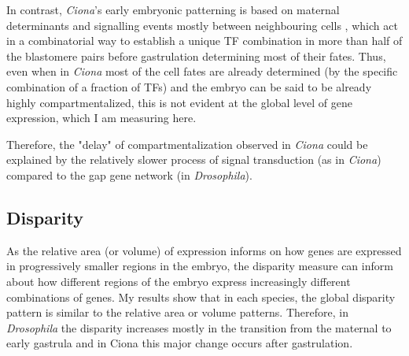 In contrast,  \textit{Ciona}'s early embryonic patterning is based on maternal determinants and signalling events mostly between neighbouring cells \citep{Lemaire2009}, which act in a combinatorial way \citep{Hudson2007} to establish a unique TF combination in more than half of the blastomere pairs before gastrulation \citep{Imai2006} determining most of their fates.
Thus, even when in \textit{Ciona} most of the cell fates are already determined (by the specific combination of a fraction of TFs) and the embryo can be said to be already highly compartmentalized, this is not evident at the global level of gene expression, which I am measuring here.


Therefore, the "delay" of compartmentalization observed in \textit{Ciona} could be explained by the relatively slower process of signal transduction (as in \textit{Ciona}) compared to the gap gene network (in \textit{Drosophila}).



\subsection{Disparity}
As the relative area (or volume) of expression informs on how genes are expressed in progressively smaller regions in the embryo, the disparity measure can inform about how different regions of the embryo express increasingly different combinations of genes.
%
My results show that in each species, the global disparity pattern is similar to the relative area or volume patterns.
Therefore, in \textit{Drosophila} the disparity increases mostly in the transition from the maternal to early gastrula and in Ciona this major change occurs after gastrulation.

